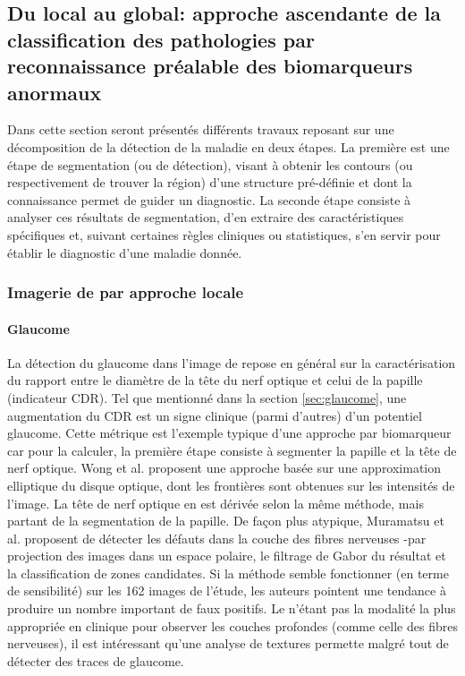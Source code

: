 \subsection{Du local au global: approche ascendante de la classification des pathologies par reconnaissance préalable des biomarqueurs anormaux}
\label{sec:approcheLocale}
Dans cette section seront présentés différents travaux reposant sur une décomposition de la détection de la maladie en deux étapes. La première est une étape de segmentation (ou de détection), visant à obtenir les contours (ou respectivement de trouver la région) d'une structure pré-définie et dont la connaissance permet de guider un diagnostic. La seconde étape consiste à analyser ces résultats de segmentation, d'en extraire des caractéristiques spécifiques et, suivant certaines règles cliniques ou statistiques, s'en servir pour établir le diagnostic d'une maladie donnée.
\subsubsection{Imagerie de \fundus{} par approche locale}
\label{sec:approcheLocaleFundus}



\paragraph{Glaucome}
La détection du glaucome dans l'image de \fundus{} repose en général sur la caractérisation du rapport entre le diamètre de la tête du nerf optique et celui de la papille (indicateur \ac{CDR}). Tel que mentionné dans la section \ref{sec:glaucome}, une augmentation du \ac{CDR} est un signe clinique (parmi d'autres) d'un potentiel glaucome. Cette métrique est l'exemple typique d'une approche par biomarqueur car pour la calculer, la première étape consiste à segmenter la papille et la tête de nerf optique. Wong et al.\cite{wongLevelsetBasedAutomatic2008} proposent une approche basée sur une approximation elliptique du disque optique, dont les frontières sont obtenues sur les intensités de l'image. La tête de nerf optique en est dérivée selon la même méthode, mais partant de la segmentation de la papille. 
De façon plus atypique, Muramatsu et al.\cite{muramatsuDetectionRetinalNerve2010} proposent de détecter les défauts dans la couche des fibres nerveuses -par projection des images dans un espace polaire, le filtrage de Gabor du résultat et la classification de zones candidates. Si la méthode semble fonctionner (en terme de sensibilité) sur les 162 images de l'étude, les auteurs pointent une tendance à produire un nombre important de faux positifs. Le \fundus{} n'étant pas la modalité la plus appropriée en clinique pour observer les couches profondes (comme celle des fibres nerveuses), il est intéressant qu'une analyse de textures permette malgré tout de détecter des traces de glaucome.
